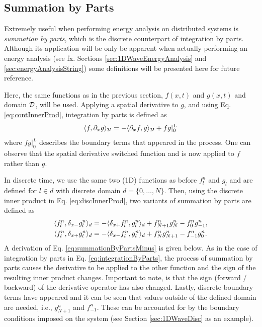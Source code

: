 \subsection{Summation by Parts}\label{sec:summationByParts}
Extremely useful when performing energy analysis on distributed systems is \textit{summation by parts}, which is the discrete counterpart of integration by parts. Although its application will be only be apparent when actually performing an energy analysis (see fx. Sections \ref{sec:1DWaveEnergyAnalysis} and \ref{sec:energyAnalysisString}) some definitions will be presented here for future reference.

Here, the same functions as in the previous section, $f(x,t)$ and $g(x,t)$ and domain $\mathcal{D}$, will be used. Applying a spatial derivative to $g$, and using Eq. \eqref{eq:contInnerProd}, integration by parts is defined as
\begin{equation}\label{eq:integrationByParts}
    \langle f, \partial_x g \rangle_{\mathcal{D}} = -\langle \partial_x f, g\rangle_{\mathcal{D}} + fg|_0^L
\end{equation}
where $fg|_0^L$ describes the boundary terms that appeared in the process. One can observe that the spatial derivative switched function and is now applied to $f$ rather than $g$.

In discrete time, we use the same two (1D) functions as before $f_l^n$ and $g_l$ and are defined for $l\in d$ with discrete domain $d=\{0, \hdots, N\}$. Then, using the discrete inner product in Eq. \eqref{eq:discInnerProd}, two variants of summation by parts are defined as
\begin{subequations}\label{eq:summationByParts}
    \begin{align}
        \langle f_l^n, \delta_{x-} g_l^n \rangle_d  &= -\langle \delta_{x+} f_l^n, g_l^n\rangle_d + f_{N+1}^ng_N^n - f_0^ng_{-1}^n,\label{eq:summationByPartsMinus}\\
        \langle f_l^n, \delta_{x+} g_l^n \rangle_d 
        &= -\langle \delta_{x-} f_l^n, g_l^n\rangle_d + f_N^ng_{N+1}^n - f_{-1}^ng_0^n.\label{eq:summationByPartsPlus}
    \end{align}
\end{subequations}
A derivation of Eq. \eqref{eq:summationByPartsMinus} is given below. As in the case of integration by parts in Eq. \eqref{eq:integrationByParts}, the process of summation by parts causes the derivative to be applied to the other function and the sign of the resulting inner product changes. Important to note, is that the sign (forward / backward) of the derivative operator has also changed. Lastly, discrete boundary terms have appeared and it can be seen that values outside of the defined domain are needed, i.e., $g_{N+1}^n$ and $f_{-1}^n$. These can be accounted for by the boundary conditions imposed on the system (see Section \ref{sec:1DWaveDisc} as an example). 

